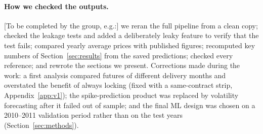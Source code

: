 \paragraph{How we checked the outputs.} [To be completed by the group, e.g.:] we reran the full pipeline
from a clean copy; checked the leakage tests and added a deliberately leaky feature to verify that the test
fails; compared yearly average prices with published figures; recomputed key numbers of Section~\ref{sec:results}
from the saved predictions; checked every reference; and rewrote the sections we present.
Corrections made during the work: a first analysis compared futures of different delivery months and
overstated the benefit of always locking (fixed with a same-contract strip, Appendix~\ref{app:v1}); the
spike-prediction product was replaced by volatility forecasting after it failed out of sample; and the
final ML design was chosen on a 2010--2011 validation period rather than on the test years
(Section~\ref{sec:methods}).

